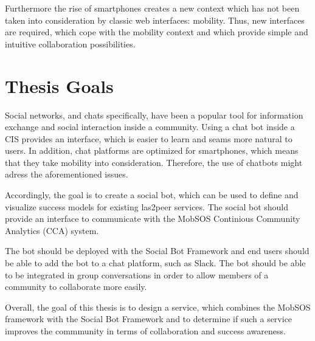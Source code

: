 Furthermore the rise of smartphones creates a new context which has not been taken into consideration by classic web interfaces: mobility.
Thus, new interfaces are required, which cope with the mobility context and which provide simple and intuitive collaboration possibilities.

\section{Thesis Goals}

Social networks, and chats specifically, have been a popular tool for information exchange and social interaction inside a community. Using a chat bot inside a CIS provides an interface, which is easier to learn and seams more natural to users. In addition, chat platforms are optimized for smartphones, which means that they take mobility into consideration. Therefore, the use of chatbots might adress the aforementioned issues.

Accordingly, the goal is to create a social bot, which can be used to define and visualize success models for existing las2peer services. The social bot should provide an interface to communicate with the MobSOS Continious Community Analytics (CCA) system.

The bot should be deployed with the Social Bot Framework and end users should be able to add the bot to a chat platform, such as Slack. The bot should be able to be integrated in group conversations in order to allow members of a community to collaborate more easily.

Overall, the goal of this thesis is to design a service, which combines the MobSOS framework with the Social Bot Framework and to determine if such a service improves the commmunity in terms of collaboration and success awareness.



